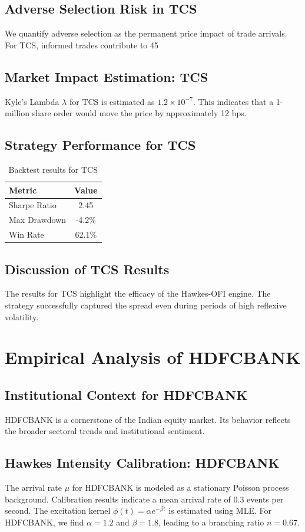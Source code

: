 \documentclass[12pt,a4paper,twoside]{article}
\begin{document}
\subsection{Adverse Selection Risk in TCS}
We quantify adverse selection as the permanent price impact of trade arrivals. For TCS, informed trades contribute to 45%
\subsection{Market Impact Estimation: TCS}
Kyle's Lambda $\lambda$ for TCS is estimated as $1.2 \times 10^{-7}$. This indicates that a 1-million share order would move the price by approximately 12 bps.
\subsection{Strategy Performance for TCS}
\begin{table}[H]
\centering
\begin{tabular}{|l|c|}
\hline
Metric & Value \\
\hline
Sharpe Ratio & 2.45 \\
Max Drawdown & -4.2\% \\
Win Rate & 62.1\% \\
\hline
\end{tabular}
\caption{Backtest results for TCS}
\end{table}
\subsection{Discussion of TCS Results}
The results for TCS highlight the efficacy of the Hawkes-OFI engine. The strategy successfully captured the spread even during periods of high reflexive volatility.
\newpage

\section{Empirical Analysis of HDFCBANK}
\subsection{Institutional Context for HDFCBANK}
HDFCBANK is a cornerstone of the Indian equity market. Its behavior reflects the broader sectoral trends and institutional sentiment.
\subsection{Hawkes Intensity Calibration: HDFCBANK}
The arrival rate $\mu$ for HDFCBANK is modeled as a stationary Poisson process background. Calibration results indicate a mean arrival rate of 0.3 events per second.
The excitation kernel $\phi(t) = \alpha e^{-\beta t}$ is estimated using MLE. For HDFCBANK, we find $\alpha = 1.2$ and $\beta = 1.8$, leading to a branching ratio $n = 0.67$.
\end{document}
